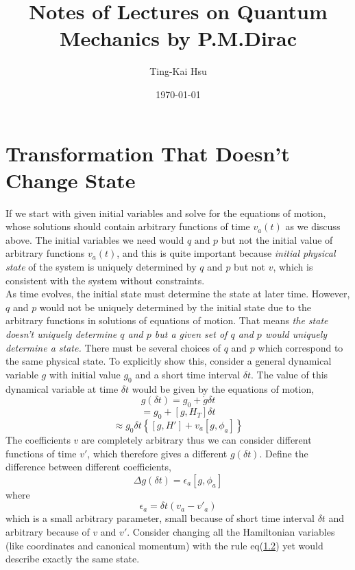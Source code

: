 \documentclass[12pt]{article}
\title{Notes of Lectures on Quantum Mechanics by P.M.Dirac}
\author{Ting-Kai Hsu}
\date{\today}
\numberwithin{equation}{section}
\begin{document}
\maketitle
\tableofcontents
\section{Transformation That Doesn't Change State}
If we start with given initial variables and solve for the equations of motion, whose solutions should contain arbitrary functions of time $v_a(t)$ as we discuss above.
The initial variables we need would $q\text{ and }p$ but not the initial value of arbitrary functions $v_a(t)$, and this is quite important because \textit{initial physical state} of the system is uniquely determined by $q$ and $p$ but not $v$, which is consistent with the system without constraints.
\\\indent As time evolves, the initial state must determine the state at later time. 
However, $q$ and $p$ would not be uniquely determined by the initial state due to the arbitrary functions in solutions of equations of motion.
That means \textit{the state doesn't uniquely determine $q$ and $p$ but a given set of $q$ and $p$ would uniquely determine a state.}
There must be several choices of $q$ and $p$ which correspond to the same physical state.
To explicitly show this, consider a general dynamical variable $g$ with initial value $g_0$ and a short time interval $\delta t$.
The value of this dynamical variable at time $\delta t$ would be given by the equations of motion,
\[g(\delta t) = g_0 + \dot{g}\delta t\]
\[ = g_0 + \left[g, H_{T}\right]\delta t\]
\begin{equation}
    \approx g_0\delta t\left\{[g, H'] + v_a[g, \phi_a]\right\}
\end{equation}
The coefficients $v$ are completely arbitrary thus we can consider different functions of time $v'$, which therefore gives a different $g(\delta t)$.
Define the difference between different coefficients,
\begin{equation}
    \Delta g(\delta t) = \epsilon_a\left[g, \phi_a\right]
\end{equation}\label{1.2}
where
\begin{equation}
    \epsilon_a = \delta t(v_a - v'_a)
\end{equation}
which is a small arbitrary parameter, small because of short time interval $\delta t$ and arbitrary because of $v$ and $v'$.
Consider changing all the Hamiltonian variables (like coordinates and canonical momentum) with the rule eq(\hyperref[1.2]{1.2}) yet would describe exactly the same state.
\end{document}
